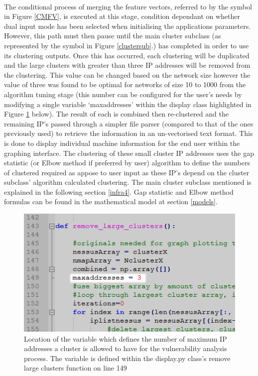 \paragraph{}The conditional process of merging the feature vectors, referred to by the symbol in Figure \ref{CMFV}, is executed at this stage, condition dependant on whether dual input mode has been selected when initialising the applications parameters. However, this path must then pause until the main cluster subclass (as represented by the symbol in Figure \ref{clustersub}.) has completed in order to use its clustering outputs. Once this has occurred, each clustering will be duplicated and the large clusters with greater than three IP addresses will be removed from the clustering. This value can be changed based on the network size however the value of three was found to be optimal for networks of size 10 to 1000 from the algorithm tuning stage (this number can be configured for the user’s needs by modifying a single variable ‘maxaddresses’ within the display class highlighted in Figure \ref{ipno} below). The result of each is combined then re-clustered and the remaining IP’s passed through a simpler file parser (compared to that of the ones previously used) to retrieve the information in an un-vectorised text format. This is done to display individual machine information for the end user within the graphing interface. The clustering of these small cluster IP addresses uses the gap statistic (or Elbow method if preferred by user) algorithm to define the numbers of clustered required as appose to user input as these IP’s depend on the cluster subclass’ algorithm calculated clustering. The main cluster subclass mentioned is explained in the following section \ref{infra4}. Gap statistic and Elbow method formulas can be found in the mathematical model at section \ref{models}.

\begin{figure}[!h]
\centering
\includegraphics{./Figures/ipno.png}
\caption{Location of the variable which defines the number of maximum IP addresses a cluster is allowed to have for the vulnerability analysis process. The variable is defined within the display.py class’s remove large clusters function on line 149}
\label{ipno}
\end{figure}


